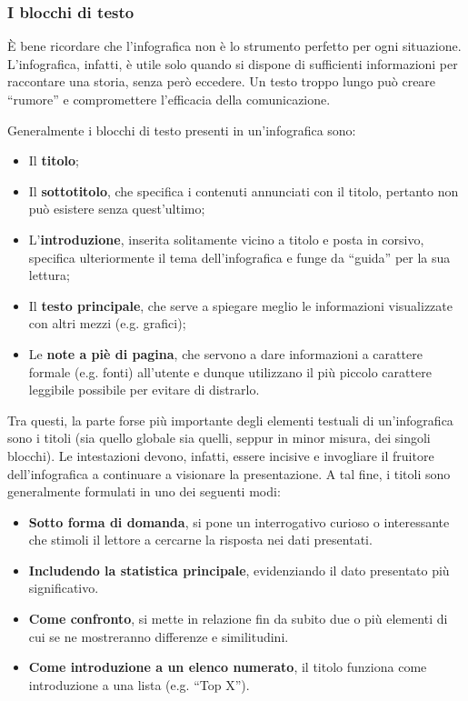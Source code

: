 \subsubsection{I blocchi di testo}
È bene ricordare che l'infografica non è lo strumento perfetto per ogni situazione. L'infografica, infatti, è utile solo quando si dispone di sufficienti informazioni 
per raccontare una storia, senza però eccedere. Un testo troppo lungo può creare ``rumore'' e compromettere l'efficacia della comunicazione.

Generalmente i blocchi di testo presenti in un'infografica sono:
\begin{itemize}
    \item Il \textbf{titolo};
    \item Il \textbf{sottotitolo}, che specifica i contenuti annunciati con il titolo, pertanto non può esistere senza quest'ultimo;
    \item L'\textbf{introduzione}, inserita solitamente vicino a titolo e posta in corsivo, specifica ulteriormente il tema dell'infografica e funge da ``guida'' per la sua lettura;
    \item Il \textbf{testo principale}, che serve a spiegare meglio le informazioni visualizzate con altri mezzi (e.g. grafici);
    \item Le \textbf{note a piè di pagina}, che servono a dare informazioni a carattere formale (e.g. fonti) all'utente e dunque utilizzano il più piccolo carattere leggibile possibile per evitare 
    di distrarlo.
\end{itemize}
Tra questi, la parte forse più importante degli elementi testuali di un'infografica sono i titoli (sia quello globale sia quelli, seppur in minor misura, dei singoli blocchi).
Le intestazioni devono, infatti, essere incisive e invogliare il fruitore dell'infografica a continuare a visionare la presentazione. 
A tal fine, i titoli sono generalmente formulati in uno dei seguenti modi:
\begin{itemize}
    \item \textbf{Sotto forma di domanda}, si pone un interrogativo curioso o interessante che stimoli il lettore a cercarne la risposta nei dati presentati.
    \item \textbf{Includendo la statistica principale}, evidenziando il dato presentato più significativo.
    \item \textbf{Come confronto}, si mette in relazione fin da subito due o più elementi di cui se ne mostreranno differenze e similitudini.
    \item \textbf{Come introduzione a un elenco numerato}, il titolo funziona come introduzione a una lista (e.g. ``Top X'').
\end{itemize}

